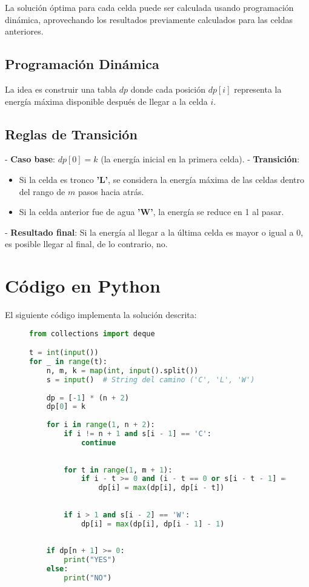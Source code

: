\documentclass{article}
\begin{document}
La solución óptima para cada celda puede ser calculada usando programación dinámica, aprovechando los resultados previamente calculados para las celdas anteriores.

\subsection*{Programación Dinámica}

La idea es construir una tabla \( dp \) donde cada posición \( dp[i] \) representa la energía máxima disponible después de llegar a la celda \( i \).

\subsection*{Reglas de Transición}
- \textbf{Caso base}: \( dp[0] = k \) (la energía inicial en la primera celda).
- \textbf{Transición}:
    \begin{itemize}
        \item Si la celda es tronco \textbf{'L'}, se considera la energía máxima de las celdas dentro del rango de \( m \) pasos hacia atrás.
        \item Si la celda anterior fue de agua \textbf{'W'}, la energía se reduce en 1 al pasar.
    \end{itemize}
- \textbf{Resultado final}: Si la energía al llegar a la última celda es mayor o igual a 0, es posible llegar al final, de lo contrario, no.

\section*{Código en Python}

El siguiente código implementa la solución descrita:
\begin{figure}[H]
    

\begin{lstlisting}[language=Python]
from collections import deque

t = int(input())  
for _ in range(t):
    n, m, k = map(int, input().split())  
    s = input()  # String del camino ('C', 'L', 'W')
    
    dp = [-1] * (n + 2)  
    dp[0] = k  
    
    for i in range(1, n + 2):  
        if i != n + 1 and s[i - 1] == 'C':  
            continue
        
       
        for t in range(1, m + 1):
            if i - t >= 0 and (i - t == 0 or s[i - t - 1] == 'L'): 
                dp[i] = max(dp[i], dp[i - t])  
        
   
        if i > 1 and s[i - 2] == 'W':
            dp[i] = max(dp[i], dp[i - 1] - 1)
    
   
    if dp[n + 1] >= 0:
        print("YES")
    else:
        print("NO")
\end{lstlisting}
\end{figure}
\end{document}
